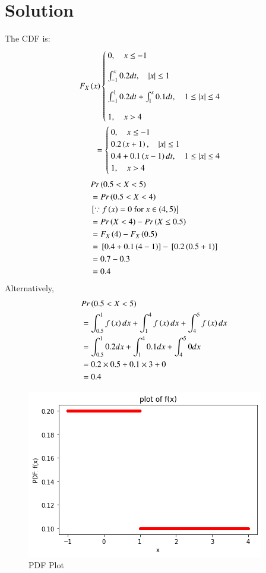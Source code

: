 \documentclass[journal,12pt,twocolumn]{IEEEtran}
\begin{document}
\section{Solution}
The CDF is:
\begin{align}
    F_X\left(x\right)
    \begin{cases}
    0, \quad x\le -1\\[1em]
    \int_{-1}^x 0.2 dt,\quad |x|\le 1\\[1em]
    \int_{-1}^{1} 0.2 dt + \int_1^x 0.1 dt, \quad 1\le |x| \le 4\\[1em]
    1,\quad x>4
    \end{cases}
    \\=
    \begin{cases}
    0, \quad x\le -1\\
    0.2\left(x+1\right),\quad |x|\le 1\\
    0.4 + 0.1\left(x-1\right) dt, \quad 1\le |x| \le 4\\
    1,\quad x>4
    \end{cases}
\end{align}
\begin{align}
    &Pr\left(0.5 < X < 5\right)\\
    &= Pr\left(0.5 < X < 4\right)\\
    &{}\left[\because f\left(x\right) = 0\text{ for}\ x \in \left(4,5\right)\right]\\
    &= Pr\left(X < 4\right)- Pr\left(X \le 0.5\right)\\
    &= F_X\left(4\right) - F_X\left(0.5\right)\\
    &= {}\left[0.4+ 0.1\left(4-1\right)\right]- {}\left[0.2\left(0.5+1\right)\right]\\
    &=0.7-0.3\\
    &=0.4
\end{align}
Alternatively,
\begin{align}
    &Pr\left(0.5 < X < 5\right)\\
    &= \int_{0.5}^1 f\left(x\right) dx +\int_1^4 f\left(x\right) dx + \int_4^5 f\left(x\right) dx\\
    &= \int_{0.5}^1 0.2 dx +\int_1^4 0.1 dx + \int_4^5 0 dx\\
    &= 0.2\times 0.5 + 0.1\times 3 + 0\\
    &= 0.4
\end{align}
\begin{figure}[!ht]
\centering
\includegraphics[width=\columnwidth]{pdf.png}
\caption{PDF Plot}
\label{fig:PDF Plot}
\end{figure}
\end{document}
